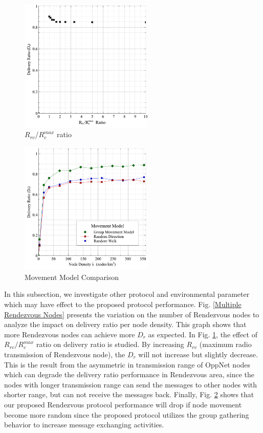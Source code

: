 \documentclass[conference]{IEEEtran}
\begin{document}
\begin{figure}[!t]
\centering
\includegraphics[width=2.5in]{Graphs/RcmaxRrv.pdf}
\caption{$R_{rv}$/$R_c^{max}$ ratio}
\label{RrvRcmaxRatio}
\end{figure}

\begin{figure}[!t]
\centering
\includegraphics[width=2.5in]{Graphs/movement.pdf}
\caption{Movement Model Comparison}
\label{Movement Model Comparison}
\end{figure}

In this subsection, we investigate other protocol and environmental parameter which may have effect to the proposed protocol performance.
%
Fig. \ref{Multiple Rendezvous Nodes} presents the variation on the number of Rendezvous nodes to analyze the impact on delivery ratio per node density.
%
This graph shows that more Rendezvous nodes can achieve more $D_r$ as expected.
%
In Fig. \ref{RrvRcmaxRatio}, the effect of $R_{rv}/R_c^{max}$ ratio on delivery ratio is studied.
% 
By increasing $R_{rv}$ (maximum radio transmission of Rendezvous node), the $D_r$ will not increase but slightly decrease.
%
This is the result from the asymmetric in transmission range of OppNet nodes which can degrade the delivery ratio performance in Rendezvous area, since the nodes with longer transmission range can send the messages to other nodes with shorter range, but can not receive the messages back.
Finally, Fig. \ref{Movement Model Comparison} shows that our proposed Rendezvous protocol performance will drop if node movement become more random since the proposed protocol utilizes the group gathering behavior to increase message exchanging activities.
\end{document}
